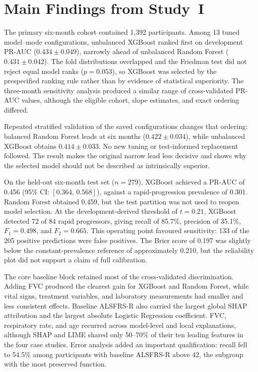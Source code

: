 \section{Main Findings from Study~I}
\label{sec:conclusion_study1}

The primary six-month cohort contained 1,392 participants. Among 13 tuned model--mode configurations, unbalanced XGBoost ranked first on development \gls{PR-AUC} ($0.434 \pm 0.049$), narrowly ahead of unbalanced Random Forest ($0.431 \pm 0.042$). The fold distributions overlapped and the Friedman test did not reject equal model ranks ($p=0.053$), so XGBoost was selected by the prespecified ranking rule rather than by evidence of statistical superiority. The three-month sensitivity analysis produced a similar range of cross-validated \gls{PR-AUC} values, although the eligible cohort, slope estimates, and exact ordering differed.

Repeated stratified validation of the saved configurations changes that ordering: balanced Random Forest leads at six months ($0.422\pm0.034$), while unbalanced XGBoost obtains $0.414\pm0.033$. No new tuning or test-informed replacement followed. The result makes the original narrow lead less decisive and shows why the selected model should not be described as intrinsically superior.

On the held-out six-month test set ($n=279$), XGBoost achieved a \gls{PR-AUC} of 0.456 (95\% \gls{CI}: $[0.364,\,0.568]$), against a rapid-progression prevalence of 0.301. Random Forest obtained 0.459, but the test partition was not used to reopen model selection. At the development-derived threshold of $t=0.21$, XGBoost detected 72 of 84 rapid progressors, giving recall of 85.7\%, precision of 35.1\%, $F_1=0.498$, and $F_2=0.665$. This operating point favoured sensitivity: 133 of the 205 positive predictions were false positives. The Brier score of 0.197 was slightly below the constant-prevalence reference of approximately 0.210, but the reliability plot did not support a claim of full calibration.

The core baseline block retained most of the cross-validated discrimination. Adding \gls{FVC} produced the clearest gain for XGBoost and Random Forest, while vital signs, treatment variables, and laboratory measurements had smaller and less consistent effects. Baseline \gls{ALSFRS-R} also carried the largest global \gls{SHAP} attribution and the largest absolute Logistic Regression coefficient. FVC, respiratory rate, and age recurred across model-level and local explanations, although \gls{SHAP} and \gls{LIME} shared only 50--70\% of their ten leading features in the four case studies. Error analysis added an important qualification: recall fell to 54.5\% among participants with baseline \gls{ALSFRS-R} above 42, the subgroup with the most preserved function.

